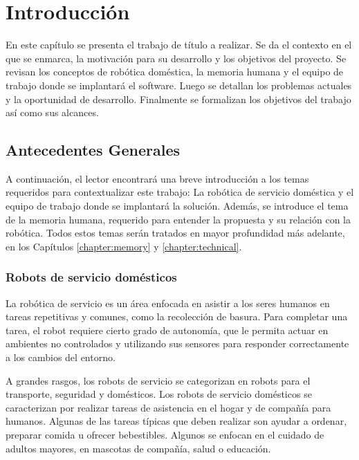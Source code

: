 \chapter{Introducción}\label{chapter:introduction}


En este capítulo se presenta el trabajo de título a realizar. Se da el contexto en el que se enmarca, la motivación para su desarrollo y los objetivos del proyecto. Se revisan los conceptos de robótica doméstica, la memoria humana y el equipo de trabajo donde se implantará el software. Luego se detallan los problemas actuales y la oportunidad de desarrollo. Finalmente se formalizan los objetivos del trabajo así como sus alcances.


\section{Antecedentes Generales}

A continuación, el lector encontrará una breve introducción a los temas requeridos para contextualizar este trabajo: La robótica de servicio doméstica y el equipo de trabajo donde se implantará la solución. Además, se introduce el tema de la memoria humana, requerido para entender la propuesta y su relación con la robótica. Todos estos temas serán tratados en mayor profundidad más adelante, en los Capítulos \ref{chapter:memory} y \ref{chapter:technical}.


\subsection{Robots de servicio domésticos}

La robótica de servicio es un área enfocada en asistir a los seres humanos en tareas repetitivas y comunes, como la recolección de basura. Para completar una tarea, el robot requiere cierto grado de autonomía, que le permita actuar en ambientes no controlados y utilizando sus sensores para responder correctamente a los cambios del entorno.

A grandes rasgos, los robots de servicio se categorizan en robots para el transporte, seguridad y domésticos. Los robots de servicio domésticos se caracterizan por realizar tareas de asistencia en el hogar y de compañía para humanos. Algunas de las tareas típicas que deben realizar son ayudar a ordenar, preparar comida u ofrecer bebestibles. Algunos se enfocan en el cuidado de adultos mayores, en mascotas de compañía, salud o educación.


